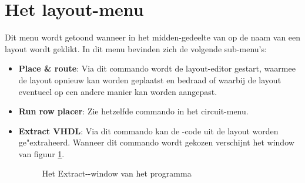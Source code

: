 \section{Het layout-menu}
Dit menu wordt getoond wanneer in het midden-gedeelte van 
op de naam van een layout wordt geklikt.
In dit menu bevinden zich de volgende sub-menu's:
\begin{itemize}
\item {\bf Place \& route}: Via dit commando wordt de layout-editor  gestart, 
waarmee de layout opnieuw kan worden geplaatst en bedraad of waarbij de layout
eventueel op een andere manier kan worden aangepast.
\item {\bf Run row placer}:
Zie hetzelfde commando in het circuit-menu.
\item {\bf Extract VHDL}: Via dit commando kan de -code uit de layout worden ge"extraheerd.
  Wanneer dit commando wordt gekozen verschijnt het window van
  figuur \ref{extr-vhdl-window}.
  \begin{figure}[htb]
  \centerline{}
  \caption{Het Extract--window van het programma }
  \label{extr-vhdl-window}
  \end{figure}


\end{itemize}
